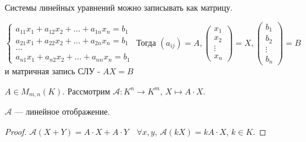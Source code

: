 \begin{example}[СЛУ]
    Системы линейных уравнений можно записывать как матрицу.

    $\begin{cases} a_{11}x_1 + a_{12}x_2 + \dots + a_{1n}x_n = b_1 \\ a_{21}x_1 + a_{22}x_2 + \dots + a_{2n}x_n = b_1 \\ \dots \\ a_{n1}x_1 + a_{n2}x_2 + \dots + a_{nn}x_n = b_1 \end{cases}$ Тогда $(a_{ij}) = A, \begin{pmatrix} x_1 \\ x_2 \\ \vdots \\ x_n \end{pmatrix} = X, \begin{pmatrix} b_1 \\ b_2 \\ \vdots \\ b_n \end{pmatrix} = B$ и матричная запись СЛУ - $AX = B$
\end{example}
\begin{remark}
    $A \in M_{m, n}(K)$. Рассмотрим  $\mathcal{A}\!: K^n \to K^m$,  $X \mapsto A \cdot X$.
\end{remark}
\begin{statement}
    $\mathcal{A}$ --- линейное отображение. 
\end{statement}
\begin{proof}
    $\mathcal{A}(X+Y) = A \cdot X + A \cdot Y\quad \forall x, y$,  $\mathcal{A}(kX) = kA\cdot X$,  $k \in K$.
\end{proof}

